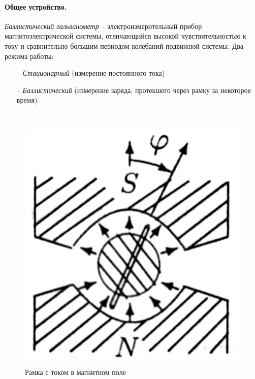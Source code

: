 \documentclass[a4paper, 12pt, twoside]{article}
\begin{document}
\begin{minipage}[l]{0.6\linewidth}
	\paragraph{Общее устройство.}
\textit{Баллистический гальванометр} -- электроизмерительный прибор магнитоэлектрической системы, отличающийся высокой чувствительностью к току и сравнительно большим периодом колебаний подвижной системы.
Два режима работы:
\begin{enumerate}
	\item[--] \textit{Стационарный} (измерение постоянного тока)
	\item[--] \textit{Баллистический} (измерение заряда, протекшего через рамку за некоторое время)
\end{enumerate}
\end{minipage}
~
\begin{minipage}[r]{0.3\linewidth}
\begin{figure}[H]
	\centering
	\includegraphics[width = 0.8\linewidth]{sch1}
	\caption[h]{Рамка с током в магнитном поле}
\end{figure}
\end{minipage}
\end{document}
